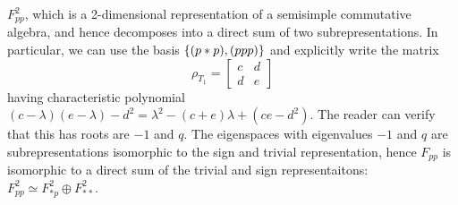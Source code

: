 \documentclass{amsart}
\begin{document}
$F_{pp}^2$, which is a 2-dimensional representation of a semisimple commutative algebra, and hence decomposes into a direct sum of two subrepresentations.
In particular, we can use the basis $\left\{ (p*p),(ppp) \right\}$ and explicitly write the matrix
\[
  \rho_{T_1} = \begin{bmatrix}
    c & d\\
    d & e
  \end{bmatrix}
\]
having characteristic polynomial $(c - \lambda)(e - \lambda) - d^2 = \lambda^2 - (c + e)\lambda +(ce - d^2)$.
The reader can verify that this has roots are $-1$ and $q$.
The eigenspaces with eigenvalues $-1$ and $q$ are subrepresentations isomorphic to the sign and trivial representation, hence $F_{pp}$ is isomorphic to a direct sum of the trivial and sign representaitons: $F^2_{pp} \simeq F^2_{*p} \oplus F^2_{**}$. 
\end{document}
